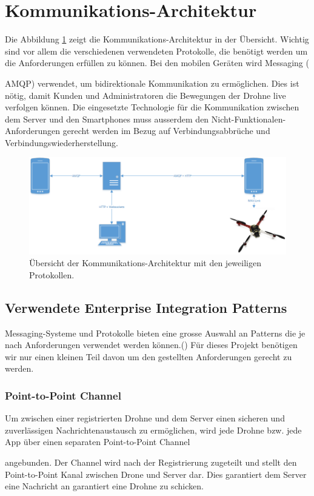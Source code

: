 \section{Kommunikations-Architektur}
Die Abbildung \ref{fig:communication-architecture-overview} zeigt die Kommunikations-Architektur in der Übersicht. Wichtig sind vor allem die verschiedenen verwendeten Protokolle, die benötigt werden um die Anforderungen erfüllen zu können. Bei den mobilen Geräten wird Messaging ({\Gls{AMQP}) verwendet, um bidirektionale Kommunikation zu ermöglichen. Dies ist nötig, damit Kunden und Administratoren die Bewegungen der Drohne live verfolgen können. Die eingesetzte Technologie für die Kommunikation zwischen dem Server und den Smartphones muss ausserdem den Nicht-Funktionalen-Anforderungen gerecht werden im Bezug auf Verbindungsabbrüche und Verbindungswiederherstellung.

\begin{figure}[H]
	\includegraphics[width=1.0\textwidth]{images/Communication-Overview-Diagram.png}
	\caption{Übersicht der Kommunikations-Architektur mit den jeweiligen Protokollen. }
	\label{fig:communication-architecture-overview}
\end{figure}

\subsection{Verwendete Enterprise Integration Patterns}
Messaging-Systeme und Protokolle bieten eine grosse Auswahl an Patterns die je nach Anforderungen verwendet werden können.({\cite{EIP}}) Für dieses Projekt benötigen wir nur einen kleinen Teil davon um den gestellten Anforderungen gerecht zu werden.
%
\subsubsection{Point-to-Point Channel}
Um zwischen einer registrierten Drohne und dem Server einen sicheren und zuverlässigen Nachrichtenaustausch zu ermöglichen, wird jede Drohne bzw. jede App über einen separaten Point-to-Point Channel	\cite[S. 103]{EIP}} angebunden. Der Channel wird nach der Registrierung zugeteilt und stellt den Point-to-Point Kanal zwischen Drone und Server dar. Dies garantiert dem Server eine Nachricht an garantiert eine Drohne zu schicken.
%
